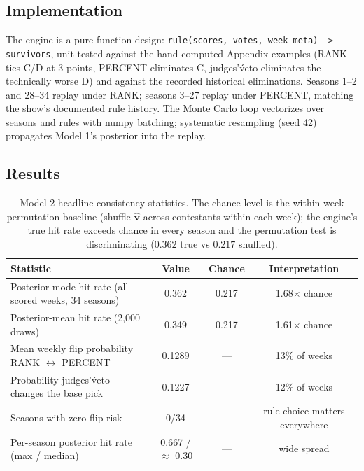 \documentclass[11pt]{article}
\begin{document}
\subsection{Implementation}

The engine is a pure-function design: \texttt{rule(scores, votes, week\_meta) -> survivors},
unit-tested against the hand-computed Appendix examples (RANK ties C/D at 3 points, PERCENT
eliminates C, judges'\' veto eliminates the technically worse D) and against the recorded
historical eliminations. Seasons 1--2 and 28--34 replay under RANK; seasons 3--27 replay under
PERCENT, matching the show's documented rule history. The Monte Carlo loop vectorizes over
seasons and rules with numpy batching; systematic resampling (seed 42) propagates Model 1's
posterior into the replay.

\subsection{Results}

\begin{table}[H]
\centering
\small
\begin{tabular}{lccc}
\toprule
\textbf{Statistic} & \textbf{Value} & \textbf{Chance} & \textbf{Interpretation}\\
\midrule
Posterior-mode hit rate (all scored weeks, 34 seasons) & 0.362 & 0.217 & 1.68$\times$ chance \\
Posterior-mean hit rate (2,000 draws) & 0.349 & 0.217 & 1.61$\times$ chance \\
Mean weekly flip probability RANK $\leftrightarrow$ PERCENT & 0.1289 & --- & 13\% of weeks \\
Probability judges'\' veto changes the base pick & 0.1227 & --- & 12\% of weeks \\
Seasons with zero flip risk & 0/34 & --- & rule choice matters everywhere \\
Per-season posterior hit rate (max / median) & 0.667 / $\approx$ 0.30 & --- & wide spread \\
\bottomrule
\end{tabular}
\caption{Model 2 headline consistency statistics. The chance level is the within-week permutation
baseline (shuffle $\hat{\mathbf{v}}$ across contestants within each week); the engine's true hit
rate exceeds chance in every season and the permutation test is discriminating ($0.362$ true vs
$0.217$ shuffled).}
\label{tab:model2}
\end{table}
\end{document}
